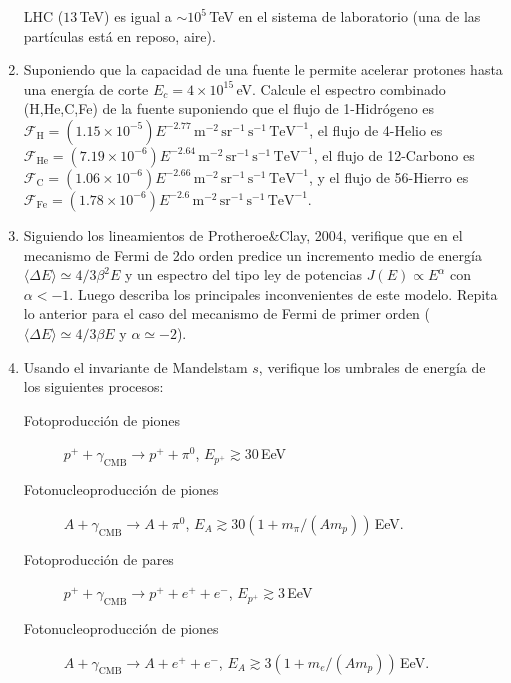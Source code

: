 \documentclass[11pt]{article}
\begin{document}
\begin{enumerate}
		LHC ($13$\,TeV) es igual a $\sim 10^{5}$\,TeV en el sistema de
		laboratorio (una de las partículas está en reposo, aire).
	\item Suponiendo que la capacidad de una fuente le permite acelerar
		protones hasta una energía de corte $E_c = 4\times10^{15}$\,eV.
		Calcule el espectro combinado (H,He,C,Fe) de la fuente suponiendo que
		el flujo de 1-Hidrógeno es $\mathcal{F}_{\mathrm{H}} = (1.15\times10^{-5})
		E^{-2.77}\,\mathrm{m}^{-2}\,\mathrm{sr}^{-1}\,\mathrm{s}^{-1}\,\mathrm{TeV}^{-1}$,
		el flujo de 4-Helio es  $\mathcal{F}_{\mathrm{He}} = (7.19\times10^{-6})
		E^{-2.64}\,\mathrm{m}^{-2}\,\mathrm{sr}^{-1}\,\mathrm{s}^{-1}\,\mathrm{TeV}^{-1}$,
		el flujo de 12-Carbono es $\mathcal{F}_{\mathrm{C}} = (1.06\times10^{-6})
		E^{-2.66}\,\mathrm{m}^{-2}\,\mathrm{sr}^{-1}\,\mathrm{s}^{-1}\,\mathrm{TeV}^{-1}$, 
		y el flujo de 56-Hierro es $\mathcal{F}_{\mathrm{Fe}} = (1.78\times10^{-6})
		E^{-2.6}\,\mathrm{m}^{-2}\,\mathrm{sr}^{-1}\,\mathrm{s}^{-1}\,\mathrm{TeV}^{-1}$.
	\item Siguiendo los lineamientos de Protheroe\&Clay, 2004, verifique que
		en el mecanismo de Fermi de 2do orden predice un incremento medio de
		energía $\langle \Delta E \rangle \simeq 4/3 \beta^2 E$ y un espectro
		del tipo ley de potencias $J(E) \propto E^{\alpha}$ con $\alpha < -1$.
		Luego describa los principales inconvenientes de este modelo. Repita
		lo anterior para el caso del mecanismo de Fermi de primer orden
		($\langle \Delta E \rangle \simeq 4/3 \beta E$ y $\alpha \simeq -2$).
	\item Usando el invariante de Mandelstam $s$, verifique los umbrales de energía de los siguientes procesos:
		\begin{description}
			\item[Fotoproducción de piones] $p^+ + \gamma_{\mathrm{CMB}} \to p^+ + \pi^0$, $E_{p^+} \gtrsim 30$\,EeV
			\item[Fotonucleoproducción de piones] $A + \gamma_{\mathrm{CMB}} \to A + \pi^0$, $E_{A} \gtrsim 30 \left ( 1 + m_\pi / \left ( A m_p \right ) \right )$\,EeV. 
			\item[Fotoproducción de pares] $p^+ + \gamma_{\mathrm{CMB}} \to p^+ + e^+ + e^-$, $E_{p^+} \gtrsim 3$\,EeV
			\item[Fotonucleoproducción de piones] $A + \gamma_{\mathrm{CMB}} \to A + e^+ + e^-$, $E_{A} \gtrsim 3 \left ( 1 + m_e / \left ( A m_p \right ) \right )$\,EeV.
		\end{description}
\end{enumerate}
\end{document}
